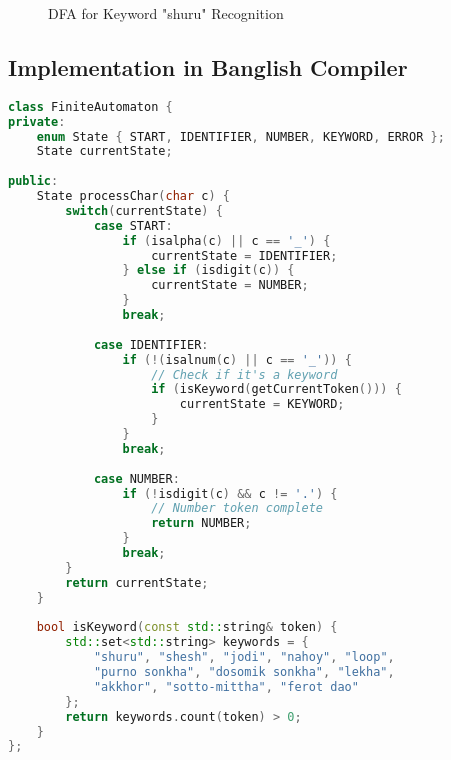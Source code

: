 \documentclass[12pt,a4paper]{article}
\begin{document}
\begin{figure}[H]
    \centering
    \caption{DFA for Keyword "shuru" Recognition}
\end{figure}

\subsection{Implementation in Banglish Compiler}

\begin{lstlisting}[language=C++, caption=DFA Implementation for Token Recognition]
class FiniteAutomaton {
private:
    enum State { START, IDENTIFIER, NUMBER, KEYWORD, ERROR };
    State currentState;
    
public:
    State processChar(char c) {
        switch(currentState) {
            case START:
                if (isalpha(c) || c == '_') {
                    currentState = IDENTIFIER;
                } else if (isdigit(c)) {
                    currentState = NUMBER;
                }
                break;
                
            case IDENTIFIER:
                if (!(isalnum(c) || c == '_')) {
                    // Check if it's a keyword
                    if (isKeyword(getCurrentToken())) {
                        currentState = KEYWORD;
                    }
                }
                break;
                
            case NUMBER:
                if (!isdigit(c) && c != '.') {
                    // Number token complete
                    return NUMBER;
                }
                break;
        }
        return currentState;
    }
    
    bool isKeyword(const std::string& token) {
        std::set<std::string> keywords = {
            "shuru", "shesh", "jodi", "nahoy", "loop",
            "purno sonkha", "dosomik sonkha", "lekha",
            "akkhor", "sotto-mittha", "ferot dao"
        };
        return keywords.count(token) > 0;
    }
};
\end{lstlisting}
\end{document}
